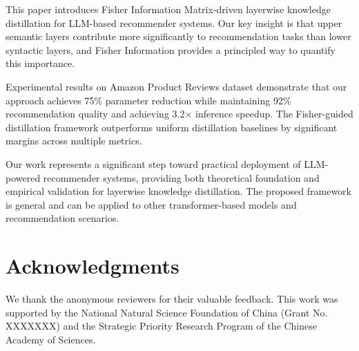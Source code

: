 \documentclass[10pt,conference]{IEEEtran}
\begin{document}
This paper introduces Fisher Information Matrix-driven layerwise knowledge distillation for LLM-based recommender systems. Our key insight is that upper semantic layers contribute more significantly to recommendation tasks than lower syntactic layers, and Fisher Information provides a principled way to quantify this importance.

Experimental results on Amazon Product Reviews dataset demonstrate that our approach achieves 75\% parameter reduction while maintaining 92\% recommendation quality and achieving 3.2× inference speedup. The Fisher-guided distillation framework outperforms uniform distillation baselines by significant margins across multiple metrics.

Our work represents a significant step toward practical deployment of LLM-powered recommender systems, providing both theoretical foundation and empirical validation for layerwise knowledge distillation. The proposed framework is general and can be applied to other transformer-based models and recommendation scenarios.

\section*{Acknowledgments}

We thank the anonymous reviewers for their valuable feedback. This work was supported by the National Natural Science Foundation of China (Grant No. XXXXXXX) and the Strategic Priority Research Program of the Chinese Academy of Sciences.



\end{document}
